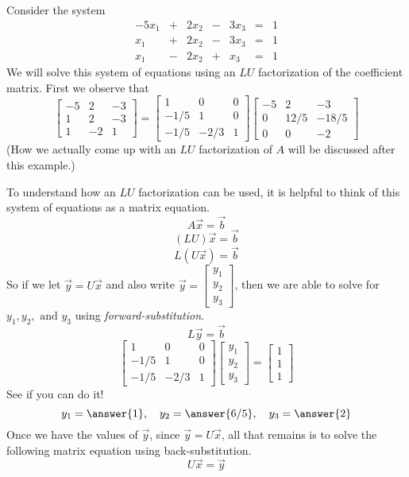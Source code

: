 \documentclass{ximera}
\begin{document}
\begin{example}\label{ex:usingLU}
Consider the system
$$\begin{array}{ccccccccc}
	 -5x_1& +&2x_2&-&3x_3&=&1\\
	   x_1 &+ &2x_2&-&3x_3&= &1 \\
      x_1&- &2x_2&+&x_3&=&1
    \end{array}$$
We will solve this system of equations using an $LU$ factorization of the coefficient matrix.  First we observe that 
\[
\begin{bmatrix}
-5 & 2 & -3 \\
1 & 2 & -3 \\
1 & -2 & 1\end{bmatrix}
=
\begin{bmatrix}
1 & 0 & 0 \\
-1/5 & 1 & 0 \\
-1/5  & -2/3  & 1
\end{bmatrix} 
\begin{bmatrix}
-5 & 2 & -3 \\
0 & 12/5  & -18/5 \\
0 & 0 & -2
\end{bmatrix}
\]
(How we actually come up with an  $LU$ factorization of $A$ will be discussed after this example.)

To understand how an $LU$ factorization can be used, it is helpful to think of this system of equations as a matrix equation.
$$A\vec{x}=\vec{b}$$
$$(LU)\vec{x}=\vec{b}$$
$$L(U\vec{x})=\vec{b}$$
So if we let $\vec{y}=U\vec{x}$ and also write $\vec{y}=\begin{bmatrix} y_1 \\ y_2 \\ y_3 \end{bmatrix}$, then we are able to solve for $ y_1, y_2, \text{ and } y_3$ using \emph{forward-substitution}.
$$L\vec{y}=\vec{b}$$
\[
\begin{bmatrix}
1 & 0 & 0 \\
-1/5 & 1 & 0 \\
-1/5  & -2/3  & 1
\end{bmatrix} 
\begin{bmatrix} y_1 \\ y_2 \\ y_3 \end{bmatrix}
=
\begin{bmatrix} 1 \\ 1 \\ 1 \end{bmatrix}
\]
See if you can do it!
$$y_1=\answer{1},\quad y_2=\answer{6/5},\quad y_3=\answer{2}$$
Once we have the values of $\vec{y}$, since $\vec{y}=U\vec{x}$, all that remains is to solve the following matrix equation using back-substitution.
$$U\vec{x}=\vec{y}$$


\end{example}
\end{document}
